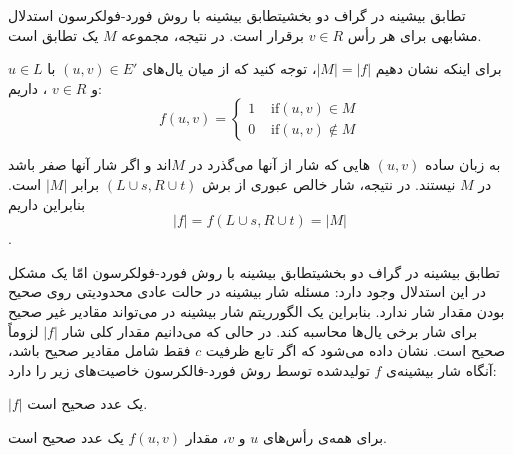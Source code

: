 \begin{itemframe-s}{تطابق بیشینه در گراف دو بخشی}{تطابق بیشینه با روش فورد-فولکرسون}
\itm
استدلال مشابهی برای هر رأس $v \in R$ برقرار است. در نتیجه، مجموعه $M$ یک تطابق است.

\itm
برای اینکه نشان دهیم $|M| = |f|$، توجه کنید که از میان یال‌های
$(u, v) \in E'$
 با
$u \in L$
 و
$v \in R$
، داریم:
$$
f(u,v) =
\begin{cases}
1 & \text{ if} (u,v) \in M \\
0 & \text{ if} (u,v) \notin M
\end{cases}
$$

به زبان ساده $(u,v)$ هایی که شار از آنها می‌گذرد در  $M$‌اند و اگر شار آنها صفر باشد در  $M$ نیستند.
\itm
در نتیجه، شار خالص عبوری از برش $(L \cup {s}, R \cup {t})$ برابر $|M|$ است.
بنابراین داریم
$$|f| = f(L \cup {s}, R \cup {t}) = |M|$$.
\end{itemframe-s}

\begin{itemframe-s}{تطابق بیشینه در گراف دو بخشی}{تطابق بیشینه با روش فورد-فولکرسون}
\itm
امّا یک مشکل در این استدلال وجود دارد:‌ مسئله شار بیشینه در حالت عادی محدودیتی روی صحیح بودن مقدار شار ندارد. بنابراین یک الگورریتم شار بیشینه در می‌تواند مقادیر غیر صحیح برای شار برخی یال‌ها محاسبه کند. در حالی که می‌دانیم مقدار کلی شار $|f|$ لزوماً صحیح است.
\itm
نشان داده می‌شود که اگر تابع ظرفیت $c$ فقط شامل مقادیر صحیح باشد، آنگاه شار بیشینه‌ی $f$ تولیدشده توسط روش فورد-فالکرسون خاصیت‌های زیر را دارد:
\item[1]
$|f|$
یک عدد صحیح است.
\item[2]
 برای همه‌ی رأس‌های $u$ و $v$، مقدار $f(u, v)$ یک عدد صحیح است.
\end{itemframe-s}

